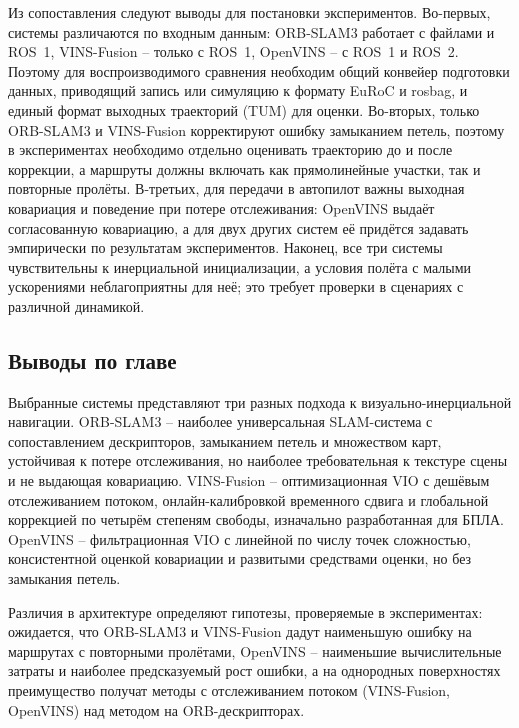     Из сопоставления следуют выводы для постановки экспериментов.
    Во-первых, системы различаются по входным данным: ORB-SLAM3 работает с файлами и ROS~1, VINS-Fusion -- только с ROS~1, OpenVINS -- с ROS~1 и ROS~2.
    Поэтому для воспроизводимого сравнения необходим общий конвейер подготовки данных, приводящий запись или симуляцию к формату EuRoC и rosbag, и единый формат выходных траекторий (TUM) для оценки.
    Во-вторых, только ORB-SLAM3 и VINS-Fusion корректируют ошибку замыканием петель, поэтому в экспериментах необходимо отдельно оценивать траекторию до и после коррекции, а маршруты должны включать как прямолинейные участки, так и повторные пролёты.
    В-третьих, для передачи в автопилот важны выходная ковариация и поведение при потере отслеживания: OpenVINS выдаёт согласованную ковариацию, а для двух других систем её придётся задавать эмпирически по результатам экспериментов.
    Наконец, все три системы чувствительны к инерциальной инициализации, а условия полёта с малыми ускорениями неблагоприятны для неё; это требует проверки в сценариях с различной динамикой.

    \subsection{Выводы по главе}

    Выбранные системы представляют три разных подхода к визуально-инерциальной навигации.
    ORB-SLAM3 -- наиболее универсальная SLAM-система с сопоставлением дескрипторов, замыканием петель и множеством карт, устойчивая к потере отслеживания, но наиболее требовательная к текстуре сцены и не выдающая ковариацию.
    VINS-Fusion -- оптимизационная VIO с дешёвым отслеживанием потоком, онлайн-калибровкой временного сдвига и глобальной коррекцией по четырём степеням свободы, изначально разработанная для БПЛА.
    OpenVINS -- фильтрационная VIO с линейной по числу точек сложностью, консистентной оценкой ковариации и развитыми средствами оценки, но без замыкания петель.

    Различия в архитектуре определяют гипотезы, проверяемые в экспериментах: ожидается, что ORB-SLAM3 и VINS-Fusion дадут наименьшую ошибку на маршрутах с повторными пролётами, OpenVINS -- наименьшие вычислительные затраты и наиболее предсказуемый рост ошибки, а на однородных поверхностях преимущество получат методы с отслеживанием потоком (VINS-Fusion, OpenVINS) над методом на ORB-дескрипторах.
    \clearpage
